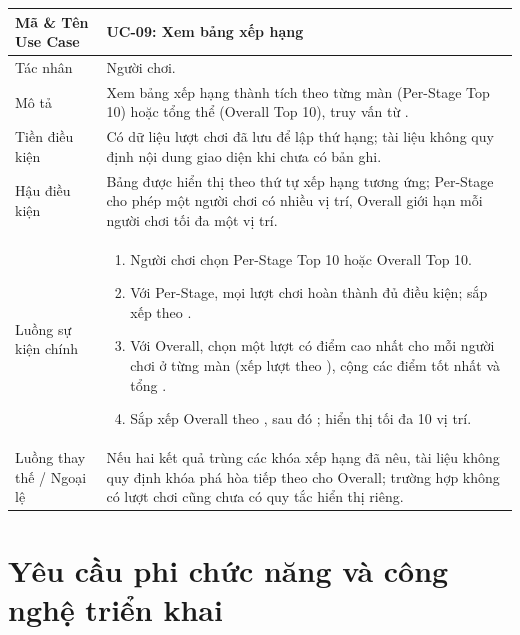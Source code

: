 \begin{xltabular}{\textwidth}{|L{3.3cm}|Y|}
\textbf{Mã \& Tên Use Case} & \textbf{UC-09: Xem bảng xếp hạng} \\ \hline
Tác nhân & Người chơi. \\ \hline
Mô tả & Xem bảng xếp hạng thành tích theo từng màn (Per-Stage Top 10) hoặc tổng thể (Overall Top 10), truy vấn từ . \\ \hline
Tiền điều kiện & Có dữ liệu lượt chơi đã lưu để lập thứ hạng; tài liệu không quy định nội dung giao diện khi chưa có bản ghi. \\ \hline
Hậu điều kiện & Bảng được hiển thị theo thứ tự xếp hạng tương ứng; Per-Stage cho phép một người chơi có nhiều vị trí, Overall giới hạn mỗi người chơi tối đa một vị trí. \\ \hline
Luồng sự kiện chính &
\begin{enumerate}[nosep,leftmargin=*]
    \item Người chơi chọn Per-Stage Top 10 hoặc Overall Top 10.
    \item Với Per-Stage, mọi lượt chơi hoàn thành đủ điều kiện; sắp xếp theo .
    \item Với Overall, chọn một lượt có điểm cao nhất cho mỗi người chơi ở từng màn (xếp lượt theo ), cộng các điểm tốt nhất và tổng .
    \item Sắp xếp Overall theo , sau đó ; hiển thị tối đa 10 vị trí.
\end{enumerate} \\ \hline
Luồng thay thế / Ngoại lệ & Nếu hai kết quả trùng các khóa xếp hạng đã nêu, tài liệu không quy định khóa phá hòa tiếp theo cho Overall; trường hợp không có lượt chơi cũng chưa có quy tắc hiển thị riêng. \\ \hline
\end{xltabular}

\section{Yêu cầu phi chức năng và công nghệ triển khai}
\label{sec:non_functional_and_tech}

